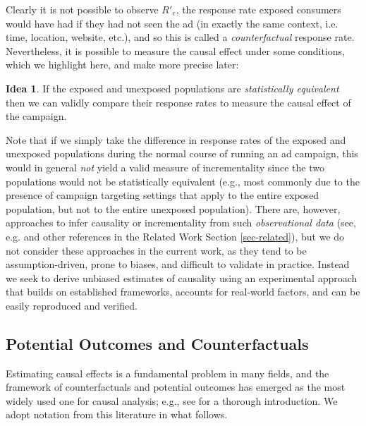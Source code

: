 \documentclass[11pt,a4paper]{article}
\theoremstyle{definition}
\theoremstyle{remark}
\theoremstyle{definition}
\theoremstyle{definition}
\theoremstyle{definition}
\theoremstyle{definition}
\newtheorem{idea}{Idea}[section]
\theoremstyle{definition}
\theoremstyle{definition}
\begin{document}
Clearly it is not possible to observe $R'_e$, the response rate exposed consumers would have had if they had not seen the ad (in exactly the same context, i.e. time, location, website, etc.), and so this is called a {\em counterfactual} response rate. 
Nevertheless, it is possible to measure the causal effect under some conditions, which we highlight here, and make more precise later:
\begin{idea}\label{idea-stat}
If the exposed and unexposed populations are {\em statistically equivalent} then we can validly compare their response rates to measure the causal effect of the campaign. 
\end{idea}
Note that if we simply take the difference in response rates of the exposed and unexposed populations during the normal course of running an ad campaign, this would in general \textit{not} yield a valid measure of incrementality since the two populations would not be statistically equivalent (e.g., most commonly due to the presence of campaign targeting settings that apply to the entire exposed population, but not to the entire unexposed population).
There are, however, approaches to infer causality or incrementality from such \textit{observational data} (see, e.g. \cite{Austin_An_2011} and other references in the Related Work Section \ref{sec-related}), but we do not consider these approaches in the current work, as they tend to be assumption-driven, prone to biases, and difficult to validate in practice. Instead we seek to derive unbiased estimates of causality using an experimental approach that builds on established frameworks, accounts for real-world factors, and can be easily reproduced and verified.


\subsection{Potential Outcomes and Counterfactuals} \label{sec-potential}


Estimating causal effects is a fundamental problem in many fields, and the framework of counterfactuals and potential outcomes has emerged as 
the most widely used one for causal analysis; e.g., see \cite{Little_Causal_2000} for a thorough introduction. 
We adopt notation from this literature in what follows.
\end{document}
